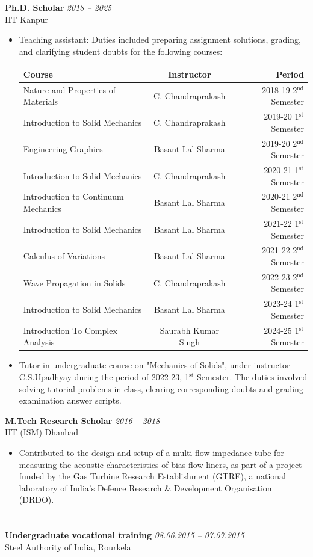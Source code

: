 \documentclass[a4paper,10pt]{article}
\newcommand{\mysectionast}[1]{\section*{\colorbox{lightgray}{\makebox[\linewidth][s]{#1\hfill}}}}
\begin{document}
	\noindent
	\textbf{Ph.D. Scholar} \hfill \textit{2018 – 2025} \\
	IIT Kanpur
	\begin{itemize}[left=0pt, label={--}]
		\item Teaching assistant: Duties included preparing assignment solutions, grading, and clarifying student doubts for the following courses:\\
		\begin{tabular}{|l|c|r|}
			\hline
			Course & Instructor & Period\\
			\hline
			Nature and Properties of Materials & C. Chandraprakash & 2018-19 2$^\mathrm{nd}$ Semester\\
			Introduction to Solid Mechanics & C. Chandraprakash & 2019-20 1$^{\mathrm{st}}$ Semester\\
			Engineering Graphics & Basant Lal Sharma & 2019-20 2$^\mathrm{nd}$ Semester\\
			Introduction to Solid Mechanics & C. Chandraprakash & 2020-21 1$^{\mathrm{st}}$ Semester\\
			Introduction to Continuum Mechanics & Basant Lal Sharma & 2020-21 2$^\mathrm{nd}$ Semester\\
			Introduction to Solid Mechanics & Basant Lal Sharma & 2021-22 1$^{\mathrm{st}}$ Semester\\
			Calculus of Variations & Basant Lal Sharma & 2021-22 2$^\mathrm{nd}$ Semester\\
			Wave Propagation in Solids & C. Chandraprakash & 2022-23 2$^\mathrm{nd}$ Semester\\
			Introduction to Solid Mechanics & Basant Lal Sharma & 2023-24 1$^{\mathrm{st}}$ Semester\\
			Introduction To Complex Analysis & Saurabh Kumar Singh& 2024-25 1$^{\mathrm{st}}$ Semester\\
			\hline
		\end{tabular}
		\item Tutor in undergraduate course on "Mechanics of Solids", under instructor C.S.Upadhyay during the period of 2022-23, 1$^{\mathrm{st}}$ Semester. The duties involved solving tutorial problems in class, clearing corresponding doubts and grading examination answer scripts.
	\end{itemize}
	\noindent
	\textbf{M.Tech Research Scholar} \hfill \textit{2016 – 2018} \\
	IIT (ISM) Dhanbad
	\begin{itemize}[left=0pt, label={--}]
		\item Contributed to the design and setup of a multi-flow impedance tube for measuring the acoustic characteristics of bias-flow liners, as part of a project funded by the Gas Turbine Research Establishment (GTRE), a national laboratory of India's Defence Research \& Development Organisation (DRDO).
	\end{itemize}
	\mysectionast{Internship}
		\noindent
	\textbf{Undergraduate vocational training } \hfill \textit{08.06.2015 – 07.07.2015} \\
	Steel Authority of India, Rourkela
	
\end{document}
